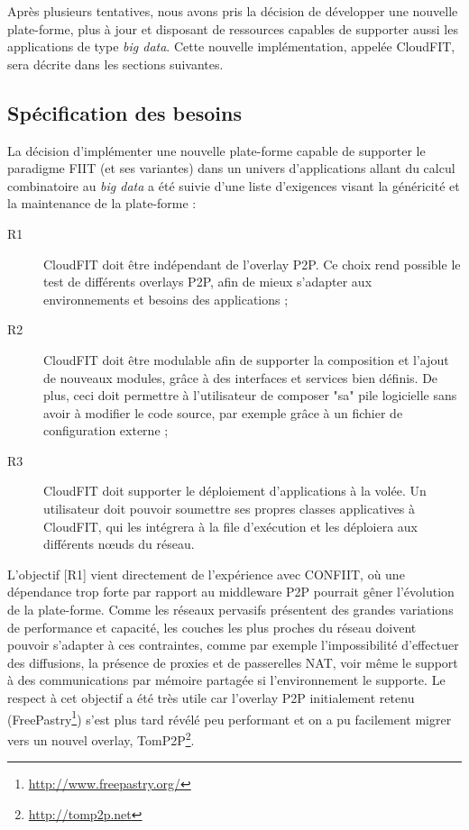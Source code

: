 Après plusieurs tentatives, nous avons pris la décision de développer une nouvelle plate-forme, plus à jour et disposant de ressources capables de supporter aussi les applications de type \textit{big data}. Cette nouvelle implémentation, appelée CloudFIT, sera décrite dans les sections suivantes. 


\subsection{Spécification des besoins}

La décision d'implémenter une nouvelle plate-forme capable de supporter le paradigme FIIT (et ses variantes) dans un univers d'applications allant du calcul combinatoire au \textit{big data} a été suivie d'une liste d'exigences visant la généricité et la maintenance de la plate-forme :

\begin{description}
	\item [R1] CloudFIT doit être indépendant de l'overlay P2P. Ce choix rend possible le test de différents overlays P2P, afin de mieux s'adapter aux environnements et besoins des applications ;
	\item [R2] CloudFIT doit être modulable afin de supporter la composition et l'ajout de nouveaux modules, grâce à des interfaces et services bien définis. De plus, ceci doit permettre à l'utilisateur de composer "sa" pile logicielle sans avoir à modifier le code source, par exemple grâce à un fichier de configuration externe ;
	\item [R3] CloudFIT doit supporter le déploiement d'applications à la volée. Un utilisateur doit pouvoir soumettre ses propres classes applicatives à CloudFIT, qui les intégrera à la file d'exécution et les déploiera aux différents n{\oe}uds du réseau.
\end{description} 


L'objectif [R1] vient directement de l'expérience avec CONFIIT, où une dépendance trop forte par rapport au middleware P2P pourrait gêner l'évolution de la plate-forme. Comme les réseaux pervasifs présentent des grandes variations de performance et capacité, les couches les plus proches du réseau doivent pouvoir s'adapter à ces contraintes, comme par exemple l'impossibilité d'effectuer des diffusions, la présence de proxies et de passerelles NAT, voir même le support à des communications par mémoire partagée si l'environnement le supporte. Le respect à cet objectif a été très utile car l'overlay P2P initialement retenu (FreePastry\footnote{\url{http://www.freepastry.org/}}) s'est plus tard révélé peu performant et on a pu facilement migrer vers un nouvel overlay, TomP2P\footnote{\url{http://tomp2p.net}}. 

